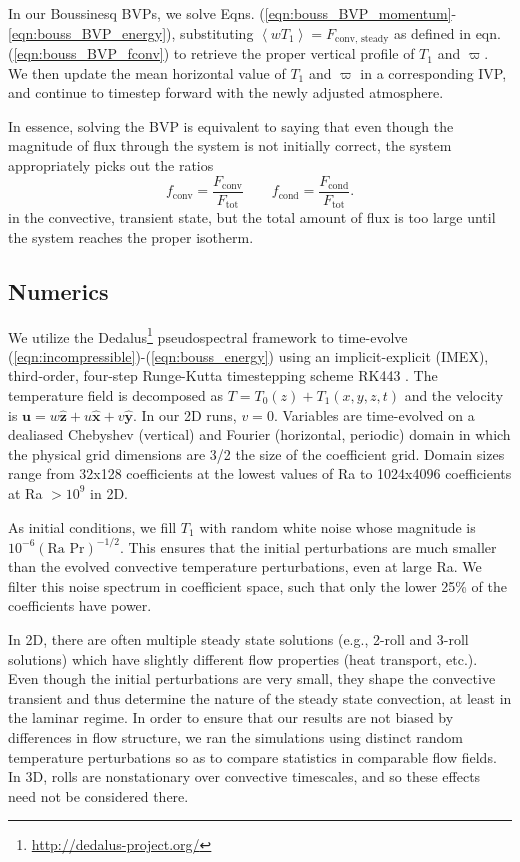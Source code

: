 \documentclass[aps, pre, onecolumn, nofootinbib, notitlepage, groupedaddress, amsfonts, amssymb, amsmath, longbibliography]{revtex4-1}
\newcommand{\angles}[1]{\ensuremath{\left\langle #1 \right\rangle}}
\begin{document}
In our Boussinesq BVPs, we solve Eqns. (\ref{eqn:bouss_BVP_momentum}-\ref{eqn:bouss_BVP_energy}),
substituting $\angles{wT_1} = F_{\text{conv, steady}}$ as defined in eqn. (\ref{eqn:bouss_BVP_fconv})
to retrieve the proper vertical profile of $T_1$ and $\varpi$.  We then update the mean horizontal value
of $T_1$ and $\varpi$ in a corresponding IVP, and continue to timestep forward with the newly adjusted
atmosphere.

In essence, solving the BVP is equivalent to saying that even though the magnitude of flux through
the system is not initially correct, the system appropriately picks out the ratios
\begin{equation}
f_{\text{conv}} = \frac{F_{\text{conv}}}{F_{\text{tot}}}\qquad
f_{\text{cond}} = \frac{F_{\text{cond}}}{F_{\text{tot}}}.
\end{equation}
in the convective, transient state, but the total amount of flux is too large until the system
reaches the proper isotherm.

\subsection{Numerics}
We utilize the 
Dedalus\footnote{\url{http://dedalus-project.org/}} 
pseudospectral framework \cite{burns&all2016} to time-evolve  
(\ref{eqn:incompressible})-(\ref{eqn:bouss_energy}) 
using an implicit-explicit (IMEX), third-order, four-step 
Runge-Kutta timestepping scheme RK443 \cite{ascher&all1997}.  
The temperature field is decomposed as $T = T_0(z) + T_1(x, y, z, t)$
and the velocity is $\bm{u} = w\bm{\hat{z}} + u\bm{\hat{x}} + v\bm{\hat{y}}$.
In our 2D runs, $v = 0$.
Variables are time-evolved on a dealiased Chebyshev (vertical)
and Fourier (horizontal, periodic) domain in which the
physical grid dimensions are 3/2 the size of the coefficient grid.  
Domain sizes range from
32x128 coefficients at the lowest values of 
Ra to 1024x4096 coefficients at Ra $> 10^{9}$ in 2D.

As initial conditions, we fill $T_1$ with
random white noise whose magnitude is $10^{-6}(\text{Ra Pr})^{-1/2}$.
This ensures that the initial perturbations are much smaller than the
evolved convective temperature perturbations, even at large Ra.
We filter this noise spectrum in coefficient space, 
such that only the lower 25\% of the coefficients
have power.

In 2D, there are often multiple steady state solutions (e.g., 2-roll and 3-roll
solutions) which have slightly different flow properties (heat transport, etc.).
Even though the initial perturbations are very small, they shape the convective
transient and thus determine the nature of the steady state convection, at least in
the laminar regime.  In order to ensure that our results are not biased by differences
in flow structure, we ran the simulations using distinct random temperature perturbations
so as to compare statistics in comparable flow fields.  In 3D, rolls are nonstationary over
convective timescales, and so these effects need not be considered there.
\end{document}
